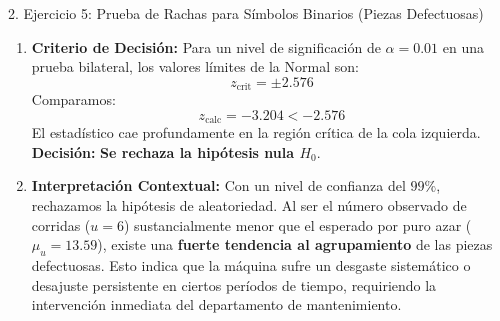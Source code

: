 \documentclass[11pt,a4paper]{article}
\begin{document}
\begin{subsection}{2. Ejercicio 5: Prueba de Rachas para Símbolos Binarios (Piezas Defectuosas)}
\begin{enumerate}
              \begin{align*}
                  \mu_u &= \frac{2 n_1 n_2}{n_1 + n_2} + 1 = \frac{2 \times 16 \times 10}{16 + 10} + 1 = \frac{320}{26} + 1 = 12.307 + 1 = \mathbf{13.593} \\
                  \sigma_u &= \sqrt{\frac{2 n_1 n_2 (2 n_1 n_2 - n_1 - n_2)}{(n_1 + n_2)^2 (n_1 + n_2 - 1)}} = \sqrt{\frac{2(16)(10) \left(2(16)(10) - 16 - 10\right)}{(26)^2 (25)}} \\
                  \sigma_u &= \sqrt{\frac{320 (320 - 26)}{(676) (25)}} = \sqrt{\frac{320 \times 294}{16900}} = \sqrt{\frac{94080}{16900}} = \sqrt{5.5668} \approx \mathbf{2.37}
              \end{align*}
              Estandarizamos el número de corridas observado ($u=6$):
              \[ z_{\text{calc}} = \frac{u - \mu_u}{\sigma_u} = \frac{6 - 13.593}{2.37} = \frac{-7.593}{2.37} = \mathbf{-3.204} \approx \mathbf{-3.20} \]
        \item \textbf{Criterio de Decisión:}
              Para un nivel de significación de $\alpha = 0.01$ en una prueba bilateral, los valores límites de la Normal son:
              \[ z_{\text{crit}} = \pm 2.576 \]
              Comparamos:
              \[ z_{\text{calc}} = -3.204 < -2.576 \]
              El estadístico cae profundamente en la región crítica de la cola izquierda.
              \textbf{Decisión:} \textbf{Se rechaza la hipótesis nula $H_0$}.
        \item \textbf{Interpretación Contextual:}
              Con un nivel de confianza del $99\%$, rechazamos la hipótesis de aleatoriedad. Al ser el número observado de corridas ($u=6$) sustancialmente menor que el esperado por puro azar ($\mu_u = 13.59$), existe una \textbf{fuerte tendencia al agrupamiento} de las piezas defectuosas. Esto indica que la máquina sufre un desgaste sistemático o desajuste persistente en ciertos períodos de tiempo, requiriendo la intervención inmediata del departamento de mantenimiento.
    \end{enumerate}
\end{subsection}
\end{document}
